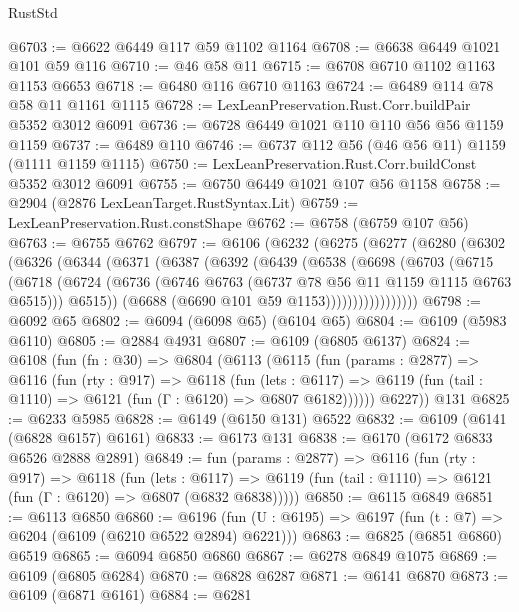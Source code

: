 \begin{lexlean}{RustStd}
\begin{coremodule}
@6703 := @6622 @6449 @117 @59 @1102 @1164
@6708 := @6638 @6449 @1021 @101 @59 @116
@6710 := @46 @58 @11
@6715 := @6708 @6710 @1102 @1163 @1153 @6653
@6718 := @6480 @116 @6710 @1163
@6724 := @6489 @114 @78 @58 @11 @1161 @1115
@6728 := LexLeanPreservation.Rust.Corr.buildPair @5352 @3012 @6091
@6736 := @6728 @6449 @1021 @110 @110 @56 @56 @1159 @1159
@6737 := @6489 @110
@6746 := @6737 @112 @56 (@46 @56 @11) @1159 (@1111 @1159 @1115)
@6750 := LexLeanPreservation.Rust.Corr.buildConst @5352 @3012 @6091
@6755 := @6750 @6449 @1021 @107 @56 @1158
@6758 := @2904 (@2876 LexLeanTarget.RustSyntax.Lit)
@6759 := LexLeanPreservation.Rust.constShape
@6762 := @6758 (@6759 @107 @56)
@6763 := @6755 @6762
@6797 := @6106
    (@6232
      (@6275
        (@6277
          (@6280
            (@6302
              (@6326
                (@6344
                  (@6371
                    (@6387
                      (@6392
                        (@6439
                          (@6538
                            (@6698
                              (@6703
                                (@6715
                                  (@6718
                                    (@6724
                                      (@6736
                                        (@6746 @6763 (@6737 @78 @56 @11 @1159 @1115 @6763 @6515)))
                                      @6515))
                                  (@6688 (@6690 @101 @59 @1153)))))))))))))))))
@6798 := @6092 @65
@6802 := @6094 (@6098 @65) (@6104 @65)
@6804 := @6109 (@5983 @6110)
@6805 := @2884 @4931
@6807 := @6109 (@6805 @6137)
@6824 := @6108
    (fun (fn : @30) =>
    @6804
      (@6113
        (@6115
          (fun (params : @2877) =>
          @6116
            (fun (rty : @917) =>
            @6118
              (fun (lets : @6117) =>
              @6119 (fun (tail : @1110) => @6121 (fun (Γ : @6120) => @6807 @6182))))))
        @6227))
    @131
@6825 := @6233 @5985
@6828 := @6149 (@6150 @131) @6522
@6832 := @6109 (@6141 (@6828 @6157) @6161)
@6833 := @6173 @131
@6838 := @6170 (@6172 @6833 @6526 @2888 @2891)
@6849 := fun (params : @2877) =>
  @6116
    (fun (rty : @917) =>
    @6118
      (fun (lets : @6117) =>
      @6119 (fun (tail : @1110) => @6121 (fun (Γ : @6120) => @6807 (@6832 @6838)))))
@6850 := @6115 @6849
@6851 := @6113 @6850
@6860 := @6196 (fun (U : @6195) => @6197 (fun (t : @7) => @6204 (@6109 (@6210 @6522 @2894) @6221)))
@6863 := @6825 (@6851 @6860) @6519
@6865 := @6094 @6850 @6860
@6867 := @6278 @6849 @1075
@6869 := @6109 (@6805 @6284)
@6870 := @6828 @6287
@6871 := @6141 @6870
@6873 := @6109 (@6871 @6161)
@6884 := @6281

\end{coremodule}
\end{lexlean}
